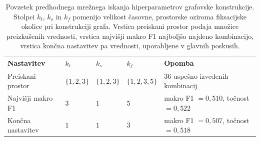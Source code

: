 \begin{table}
    \centering
    \caption{Povzetek predhodnega mrežnega iskanja hiperparametrov grafovske konstrukcije. Stolpci $k_t$, $k_s$ in $k_f$ pomenijo velikost časovne, prostorske oziroma fiksacijske okolice pri konstrukciji grafa. Vrstica preiskani prostor podaja množice preizkušenih vrednosti, vrstica najvišji makro F1 najboljšo najdeno kombinacijo, vrstica končna nastavitev pa vrednosti, uporabljene v glavnih poskusih.}
    \label{tab:mrezno-iskanje-gnn}
    \footnotesize
    \begin{tabularx}{\textwidth}{@{}>{\raggedright\arraybackslash}p{} >{\centering\arraybackslash}p{} >{\centering\arraybackslash}p{} >{\centering\arraybackslash}p{} >{\raggedright\arraybackslash}X@{}}
        \toprule
        \textbf{Nastavitev} & \textbf{$k_t$} & \textbf{$k_s$} & \textbf{$k_f$} & \textbf{Opomba} \\
        \midrule
        Preiskani prostor & $\{1,2,3\}$ & $\{1,2,3\}$ & $\{1,2,3,5\}$ & $36$ uspešno izvedenih kombinacij \\
        \midrule
        Najvišji makro F1 & $3$ & $1$ & $5$ & makro F1 $=0{,}510$, točnost $=0{,}522$ \\
        \midrule
        Končna nastavitev & $1$ & $1$ & $3$ & makro F1 $=0{,}507$, točnost $=0{,}518$\\
        \bottomrule
    \end{tabularx}
\end{table}
